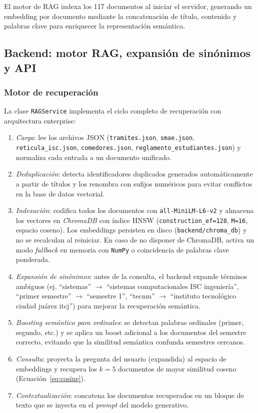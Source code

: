El motor de RAG indexa los 117 documentos al iniciar el servidor, generando un embedding por documento mediante la concatenación de título, contenido y palabras clave para enriquecer la representación semántica.

\subsection{Backend: motor RAG, expansión de sinónimos y API}

\subsubsection{Motor de recuperación}

La clase \texttt{RAGService} implementa el ciclo completo de recuperación con arquitectura enterprise:

\begin{enumerate}
    \item \textit{Carga}: lee los archivos JSON (\texttt{tramites.json}, \texttt{smae.json}, \texttt{reticula\_isc.json}, \texttt{comedores.json}, \texttt{reglamento\_estudiantes.json}) y normaliza cada entrada a un documento unificado.
    \item \textit{Deduplicación}: detecta identificadores duplicados generados automáticamente a partir de títulos y los renombra con sufijos numéricos para evitar conflictos en la base de datos vectorial.
    \item \textit{Indexación}: codifica todos los documentos con \texttt{all-MiniLM-L6-v2} y almacena los vectores en \textit{ChromaDB} con índice HNSW (\texttt{construction\_ef=128}, \texttt{M=16}, espacio coseno). Los embeddings persisten en disco (\texttt{backend/chroma\_db}) y no se recalculan al reiniciar. En caso de no disponer de ChromaDB, activa un modo \textit{fallback} en memoria con \texttt{NumPy} o coincidencia de palabras clave ponderada.
    \item \textit{Expansión de sinónimos}: antes de la consulta, el backend expande términos ambiguos (ej. ``sistemas'' $\rightarrow$ ``sistemas computacionales ISC ingeniería'', ``primer semestre'' $\rightarrow$ ``semestre 1'', ``tecnm'' $\rightarrow$ ``instituto tecnológico ciudad juárez itcj'') para mejorar la recuperación semántica.
    \item \textit{Boosting semántico para ordinales}: se detectan palabras ordinales (primer, segundo, etc.) y se aplica un boost adicional a los documentos del semestre correcto, evitando que la similitud semántica confunda semestres cercanos.
    \item \textit{Consulta}: proyecta la pregunta del usuario (expandida) al espacio de embeddings y recupera los $k=5$ documentos de mayor similitud coseno (Ecuación~\ref{eq:cosine}).
    \item \textit{Contextualización}: concatena los documentos recuperados en un bloque de texto que se inyecta en el \textit{prompt} del modelo generativo.
\end{enumerate}

